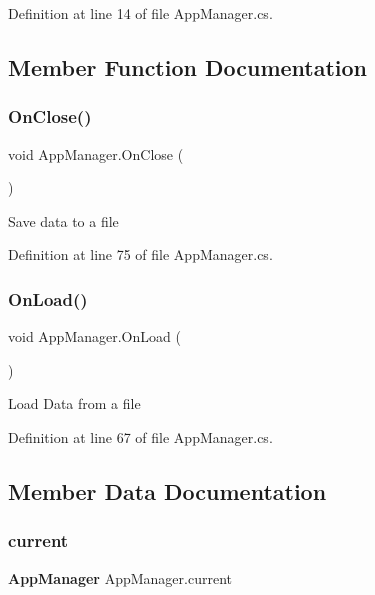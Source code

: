 Definition at line 14 of file App\+Manager.\+cs.



\subsection{Member Function Documentation}
\mbox{\label{class_app_manager_a4734343cd5bf3db58ba90c617e86f846}} 
\subsubsection{On\+Close()}
{\footnotesize\ttfamily void App\+Manager.\+On\+Close (\begin{DoxyParamCaption}{ }\end{DoxyParamCaption})}



Save data to a file 



Definition at line 75 of file App\+Manager.\+cs.

\mbox{\label{class_app_manager_a05fc978ad2a4921995abe924c7bb00dc}} 
\subsubsection{On\+Load()}
{\footnotesize\ttfamily void App\+Manager.\+On\+Load (\begin{DoxyParamCaption}{ }\end{DoxyParamCaption})}



Load Data from a file 



Definition at line 67 of file App\+Manager.\+cs.



\subsection{Member Data Documentation}
\mbox{\label{class_app_manager_a3a26de5ae747df092833a9d14eb46d5b}} 
\subsubsection{current}
{\footnotesize\ttfamily \textbf{ App\+Manager} App\+Manager.\+current\hspace{0.3cm}{\ttfamily [static]}}



